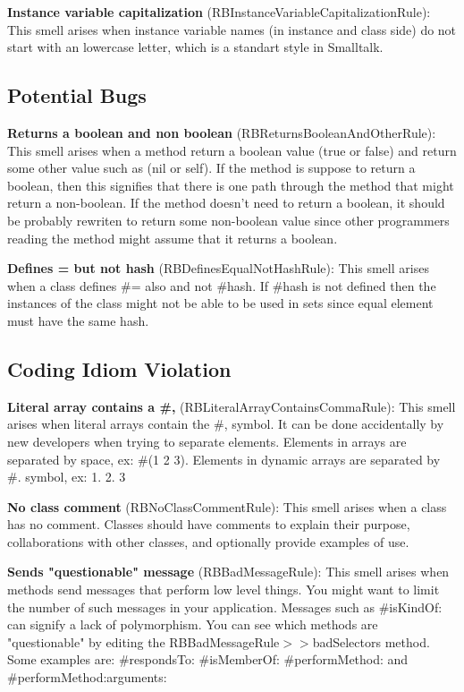 \textbf{Instance variable capitalization} (RBInstanceVariableCapitalizationRule): This smell arises when instance variable names (in instance and class side) do not start with an lowercase letter, which is a standart style in Smalltalk.

\subsection{Potential Bugs}
\textbf{Returns a boolean and non boolean} (RBReturnsBooleanAndOtherRule): This smell arises when a method return a boolean value (true or false) and return some other value such as (nil or self). If the method is suppose to return a boolean, then this signifies that there is one path through the method that might return a non-boolean. If the method doesn't need to return a boolean, it should be probably rewriten to return some non-boolean value since other programmers reading the method might assume that it returns a boolean.

\textbf{Defines = but not hash} (RBDefinesEqualNotHashRule): This smell arises when a class defines \#= also and not \#hash. If \#hash is not defined then the instances of the class might not be able to be used in sets since equal element must have the same hash.

\subsection{Coding Idiom Violation}
\textbf{Literal array contains a \#,} (RBLiteralArrayContainsCommaRule): This smell arises when literal arrays contain the \#, symbol. It can be done accidentally by new developers when trying to separate elements. Elements in arrays are separated by space, ex: \#(1 2 3). Elements in dynamic arrays are separated by \#. symbol, ex: {1. 2. 3}

\textbf{No class comment} (RBNoClassCommentRule): This smell arises when a class has no comment. Classes should have comments to explain their purpose, collaborations with other classes, and optionally provide examples of use.

\textbf{Sends "questionable" message} (RBBadMessageRule): This smell arises when methods send messages that perform low level things. You might want to limit the number of such messages in your application. Messages such as \#isKindOf: can signify a lack of polymorphism. You can see which methods are "questionable" by editing the RBBadMessageRule$>>$badSelectors method. Some examples are: \#respondsTo: \#isMemberOf: \#performMethod: and \#performMethod:arguments:

